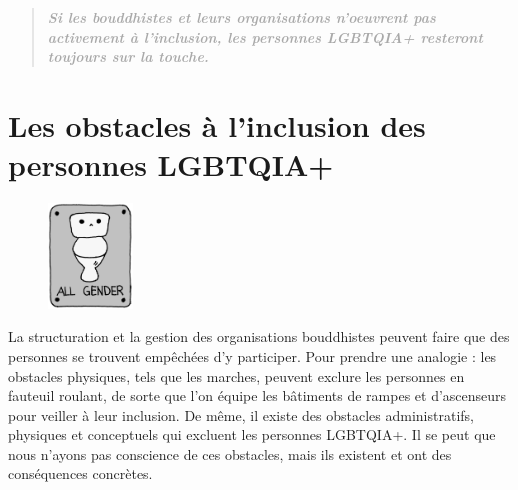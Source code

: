 \documentclass[12pt,openany]{book}
\begin{document}
\newpage
\thispagestyle{empty}
\begin{figure}[h]
    \centering
\end{figure}

\begin{quote}
\centering
\doublespacing
\textit{\Large \textbf{\textcolor{darkgray}{Si les bouddhistes et leurs organisations n’oeuvrent pas activement à l’inclusion, les personnes \mbox{LGBTQIA+} resteront toujours sur la touche.}}}
\end{quote}

\chapter*{Les obstacles à l’inclusion des personnes \mbox{LGBTQIA+}}

\begin{figure}
    \centering
    \includegraphics[width=0.2\textwidth]{16bw.png}
\end{figure}
La structuration et la gestion des organisations bouddhistes peuvent faire que des personnes se trouvent empêchées d’y participer. Pour prendre une analogie : les obstacles physiques, tels que les marches, peuvent exclure les personnes en fauteuil roulant, de sorte que l’on équipe les bâtiments de rampes et d’ascenseurs pour veiller à leur inclusion. De même, il existe des obstacles administratifs, physiques et conceptuels qui excluent les personnes \mbox{LGBTQIA+}. Il se peut que nous n’ayons pas conscience de ces obstacles, mais ils existent et ont des conséquences concrètes.
\end{document}
